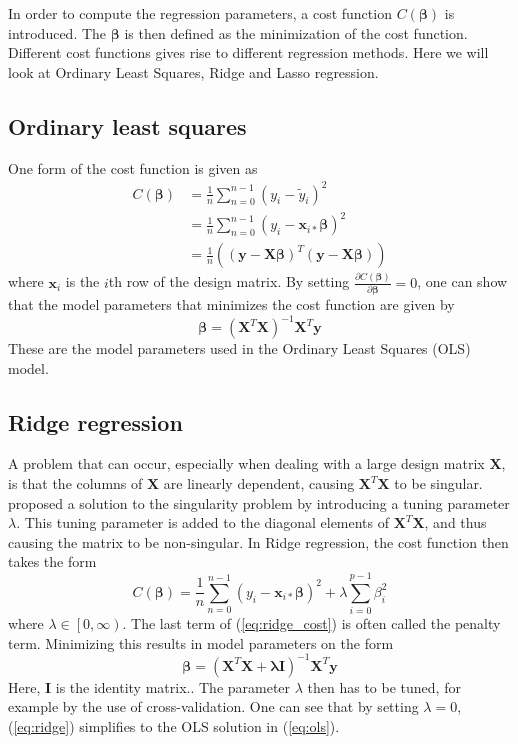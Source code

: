 In order to compute the regression parameters, a cost function $C(\boldsymbol{\beta})$ is introduced. The $\boldsymbol{\beta}$ is then defined as the minimization of the cost function. Different cost functions gives rise to different regression methods. Here we will look at Ordinary Least Squares, Ridge and Lasso regression.

\subsection{Ordinary least squares}
One form of the cost function is given as
\begin{align*}
	C(\boldsymbol{\beta})
	&= \frac{1}{n}\sum_{n=0}^{n-1} \left(y_i-\tilde{y}_i\right)^2 \\
	&= \frac{1}{n}\sum_{n=0}^{n-1} \left(y_i-\boldsymbol{x}_{i*}\boldsymbol{\beta}\right)^2\\
	&=\frac{1}{n}\left(\left(\boldsymbol{y}-\boldsymbol{X\beta}\right)^T\left(\boldsymbol{y}-\boldsymbol{X\beta}\right)\right)
\end{align*}
where $\boldsymbol{x}_{i}$ is the $i$th row of the design matrix. By setting $\frac{\partial C(\boldsymbol{\beta})}{\partial\boldsymbol{\beta}}=0$, one can show that the model parameters that minimizes the cost function are given by
\begin{equation}\label{eq:ols}
	\boldsymbol{\beta}=\left(\boldsymbol{X}^T\boldsymbol{X}\right)^{-1}\boldsymbol{X}^T\boldsymbol{y}
\end{equation}
These are the model parameters used in the Ordinary Least Squares (OLS) model.

\subsection{Ridge regression}
A problem that can occur, especially when dealing with a large design matrix $\boldsymbol{X}$, is that the columns of $\boldsymbol{X}$ are linearly dependent, causing $\boldsymbol{X}^T\boldsymbol{X}$ to be singular. \cite{hoerl1970ridge} proposed a solution to the singularity problem by introducing a tuning parameter $\lambda$. This tuning parameter is added to the diagonal elements of  $\boldsymbol{X}^T\boldsymbol{X}$, and thus causing the matrix to be non-singular.
In Ridge regression, the cost function then takes the form
\begin{equation}\label{eq:ridge_cost}
	C(\boldsymbol{\beta})
	= \frac{1}{n}\sum_{n=0}^{n-1} \left(y_i-\boldsymbol{x}_{i*}\boldsymbol{\beta}\right)^2 + \lambda \sum_{i=0}^{p-1}\beta_i^2
\end{equation}
where $\lambda \in \left[0,\infty\right)$. The last term of (\ref{eq:ridge_cost}) is often called the penalty term.
Minimizing this results in model parameters on the form
\begin{equation}\label{eq:ridge}
\boldsymbol{\beta}=\left(\boldsymbol{X}^T\boldsymbol{X}+\boldsymbol{\lambda}\boldsymbol{I}\right)^{-1}\boldsymbol{X}^T\boldsymbol{y}
\end{equation}
Here, $\boldsymbol{I}$ is the identity matrix.. The parameter $\lambda$ then has to be tuned, for example by the use of cross-validation.
One can see that by setting $\lambda = 0$, (\ref{eq:ridge}) simplifies to the OLS solution in (\ref{eq:ols}).

